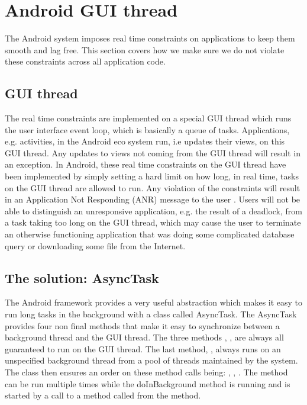 
\section{Android GUI thread}
\label{sec:gui_thread_async_task}

The Android system imposes real time constraints on applications to keep them smooth and lag free. This section covers how we make sure we do not violate these constraints across all application code.

\subsection{GUI thread}
The real time constraints are implemented on a special GUI thread which runs the user interface event loop, which is basically a queue of tasks. Applications, e.g. activities, in the Android eco system run, i.e updates their views, on this GUI thread. Any updates to views not coming from the GUI thread will result in an exception. In Android, these real time constraints on the GUI thread have been implemented by simply setting a hard limit on how long, in real time, tasks on the GUI thread are allowed to run. Any violation of the constraints will result in an Application Not Responding (ANR) message to the user \parencite{android_avoid_anr}. Users will not be able to distinguish an unresponsive application, e.g. the result of a deadlock, from a task taking too long on the GUI thread, which may cause the user to terminate an otherwise functioning application that was doing some complicated database query or downloading some file from the Internet. 

\subsection{The solution: AsyncTask}

The Android framework provides a very useful abstraction which makes it easy to run long tasks in the background with a class called AsyncTask. The AsyncTask provides four non final methods that make it easy to synchronize between a background thread and the GUI thread. The three methods , ,  are always all guaranteed to run on the GUI thread. The last method, , always runs on an unspecified background thread from a pool of threads maintained by the system. The class then ensures an order on these method calls being: , , . The  method can be run multiple times while the doInBackground method is running and is started by a call to a method called  from the  method.  


